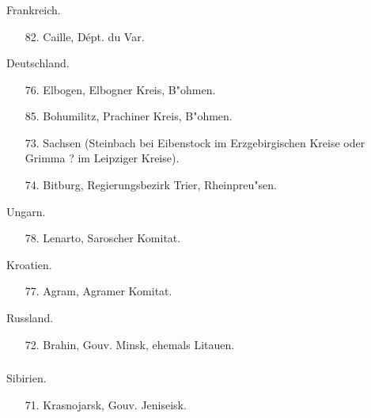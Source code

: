 \documentclass[a4paper, 11pt, oneside, polutonikogreek, german]{article}
\begin{document}
\subsubsection{}
\begin{center}
Frankreich.
\end{center}
\begin{itemize}
    
    \item[82.] Caille, Dépt. du Var.
\end{itemize}
\begin{center}
Deutschland.
\end{center}
\begin{itemize}
    
    \item[76.] Elbogen, Elbogner Kreis, B"ohmen.
    \item[85.] Bohumilitz, Prachiner Kreis, B"ohmen.
    \item[73.] Sachsen (Steinbach bei Eibenstock im Erzgebirgischen Kreise oder Grimma ? im Leipziger Kreise).
    \item[74.] Bitburg, Regierungsbezirk Trier, Rheinpreu"sen.
\end{itemize}
\begin{center}
Ungarn.
\end{center}
\begin{itemize}
    
    \item[78.] Lenarto, Saroscher Komitat.
\end{itemize}
\begin{center}
Kroatien.
\end{center}
\begin{itemize}
    
    \item[77.] Agram, Agramer Komitat.
\end{itemize}
\begin{center}
Russland.
\end{center}
\begin{itemize}
    
    \item[72.] Brahin, Gouv. Minsk, ehemals Litauen.
\end{itemize}
\subsubsection{}
\begin{center}
Sibirien.
\end{center}
\begin{itemize}
    
    \item[71.] Krasnojarsk, Gouv. Jeniseisk.
\end{itemize}
\end{document}
